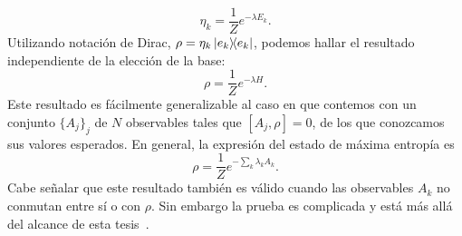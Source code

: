 \begin{equation}
    \eta_{k}=\frac{1}{Z}e^{-\lambda E_{k}}.\nonumber
\end{equation}
Utilizando notación de Dirac, $\rho=\eta_{k}\dyad{e_{k}}$, podemos hallar el resultado independiente de la elección de la base:
\begin{equation}
    \rho=\frac{1}{Z}e^{-\lambda H}.
\end{equation}
Este resultado es fácilmente generalizable al caso en que contemos con un  conjunto $\{A_{j}\}_{j}$ de $N$ observables tales que $[A_{j},\rho]=0$, de los que conozcamos sus valores esperados. En general, la expresión del estado de máxima entropía es
\begin{equation}\label{eq:GeneralMaxEnt}
    \rho=\frac{1}{Z}e^{-\sum_{k}\lambda_{k} A_{k}}.
\end{equation}
Cabe señalar que este resultado también es válido cuando las observables $A_k$ no conmutan entre sí o con $\rho$. Sin embargo la prueba es complicada y está más allá del alcance de esta tesis~\cite{FormalJaynes,Wichmann1963}.